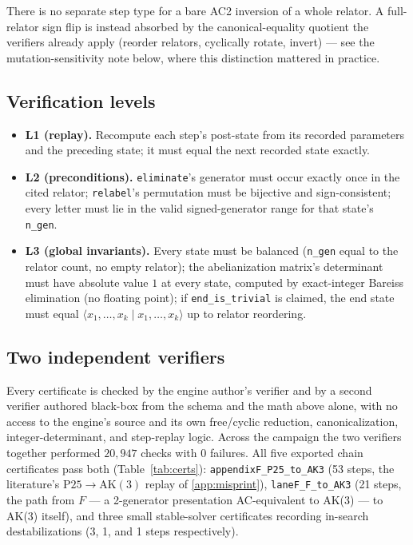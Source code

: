 There is no separate step type for a bare AC2 inversion of a whole relator. A full-relator
sign flip is instead absorbed by the canonical-equality quotient the verifiers already
apply (reorder relators, cyclically rotate, invert) --- see the mutation-sensitivity note
below, where this distinction mattered in practice.

\subsection{Verification levels}

\begin{itemize}
  \item \textbf{L1 (replay).} Recompute each step's post-state from its recorded parameters
    and the preceding state; it must equal the next recorded state exactly.
  \item \textbf{L2 (preconditions).} \texttt{eliminate}'s generator must occur exactly once
    in the cited relator; \texttt{relabel}'s permutation must be bijective and
    sign-consistent; every letter must lie in the valid signed-generator range for that
    state's \texttt{n\_gen}.
  \item \textbf{L3 (global invariants).} Every state must be balanced (\texttt{n\_gen}
    equal to the relator count, no empty relator); the abelianization matrix's determinant
    must have absolute value $1$ at every state, computed by exact-integer Bareiss
    elimination (no floating point); if \texttt{end\_is\_trivial} is claimed, the end state
    must equal $\langle x_1,\dots,x_k\mid x_1,\dots,x_k\rangle$ up to relator reordering.
\end{itemize}

\subsection{Two independent verifiers}

Every certificate is checked by the engine author's verifier and by a second verifier
authored black-box from the schema and the math above alone, with no access to the engine's
source and its own free/cyclic reduction, canonicalization, integer-determinant, and
step-replay logic. Across the campaign the two verifiers together performed $20{,}947$
checks with $0$ failures. All five exported chain certificates pass both
(Table~\ref{tab:certs}): \texttt{appendixF\_P25\_to\_AK3} (53 steps, the literature's
$\mathrm{P25}\to\mathrm{AK}(3)$ replay of \ref{app:misprint}), \texttt{laneF\_F\_to\_AK3}
(21 steps, the path from $F$ --- a 2-generator presentation AC-equivalent to AK(3) --- to AK(3)
itself), and three small stable-solver certificates recording in-search destabilizations
(3, 1, and 1 steps respectively).

